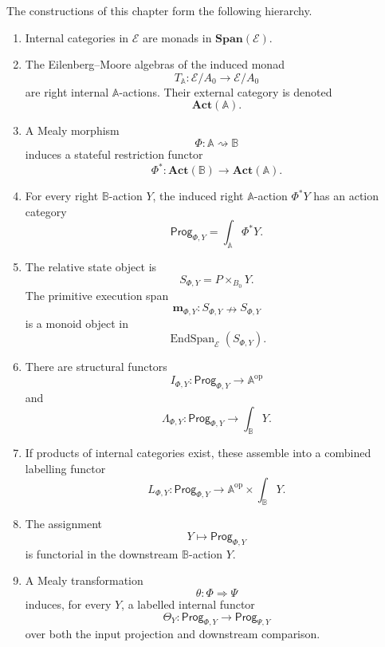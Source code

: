 \begin{theorem}
\label{thm:relative-mealy-dynamic-proarrow-logic}
The constructions of this chapter form the following hierarchy.

\begin{enumerate}
\item Internal categories in \(\mathcal E\) are monads in
\(\mathbf{Span}(\mathcal E)\).

\item The Eilenberg--Moore algebras of the induced monad
\[
T_{\mathbb A}:\mathcal E/A_0\to\mathcal E/A_0
\]
are right internal \(\mathbb A\)-actions. Their external category is denoted
\[
\mathbf{Act}(\mathbb A).
\]

\item A Mealy morphism
\[
\Phi:\mathbb A\rightsquigarrow\mathbb B
\]
induces a stateful restriction functor
\[
\Phi^\ast:\mathbf{Act}(\mathbb B)\to\mathbf{Act}(\mathbb A).
\]

\item For every right \(\mathbb B\)-action \(Y\), the induced right
\(\mathbb A\)-action \(\Phi^\ast Y\) has an action category
\[
\mathsf{Prog}_{\Phi,Y}
=
\int_{\mathbb A}\Phi^\ast Y.
\]

\item The relative state object is
\[
S_{\Phi,Y}=P\times_{B_0}Y.
\]
The primitive execution span
\[
\mathbf m_{\Phi,Y}:S_{\Phi,Y}\nrightarrow S_{\Phi,Y}
\]
is a monoid object in
\[
\operatorname{EndSpan}_{\mathcal E}(S_{\Phi,Y}).
\]

\item There are structural functors
\[
I_{\Phi,Y}:\mathsf{Prog}_{\Phi,Y}\to\mathbb A^{\mathrm{op}}
\]
and
\[
\Lambda_{\Phi,Y}:\mathsf{Prog}_{\Phi,Y}\to\int_{\mathbb B}Y.
\]

\item If products of internal categories exist, these assemble into a combined
labelling functor
\[
L_{\Phi,Y}:
\mathsf{Prog}_{\Phi,Y}
\to
\mathbb A^{\mathrm{op}}\times\int_{\mathbb B}Y.
\]

\item The assignment
\[
Y\longmapsto\mathsf{Prog}_{\Phi,Y}
\]
is functorial in the downstream \(\mathbb B\)-action \(Y\).

\item A Mealy transformation
\[
\theta:\Phi\Rightarrow\Psi
\]
induces, for every \(Y\), a labelled internal functor
\[
\Theta_Y:\mathsf{Prog}_{\Phi,Y}\to\mathsf{Prog}_{\Psi,Y}
\]
over both the input projection and downstream comparison.


\end{enumerate}
\end{theorem}
